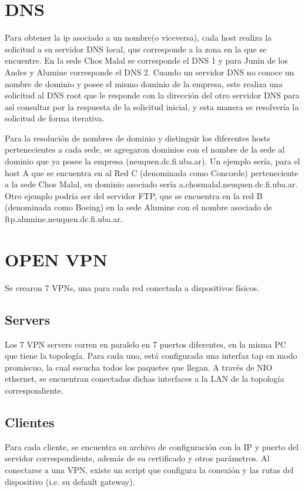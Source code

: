 \documentclass[12pt, a4paper, spanish]{article}
\begin{document}
\newpage


\newpage
\section{DNS}
Para obtener la ip asociado a un nombre(o viceversa), cada host realiza 
la solicitud a su servidor DNS local, que corresponde a la zona en la que 
se encuentre.
En la sede Chos Malal se corresponde el DNS 1 y para Junín de los Andes y 
Alumine corresponde el DNS 2.
Cuando un servidor DNS no conoce un nombre de dominio y posee el mismo 
dominio de la empresa, este realiza una solicitud al DNS root que le responde 
con la dirección del otro servidor DNS para así consultar por la respuesta de 
la solicitud inicial, y esta manera se resolvería la solicitud de forma 
iterativa.

Para la resolución de nombres de dominio y distinguir los diferentes hosts 
pertenecientes a cada sede, se agregaron dominios con el nombre de la sede 
al dominio que ya posee la empresa (neuquen.dc.fi.uba.ar).
Un ejemplo sería, para el host A que se encuentra en al Red C (denominada 
como Concorde) perteneciente a la sede Chos Malal, su dominio asociado sería 
a.chosmalal.neuquen.dc.fi.uba.ar.
Otro ejemplo podría ser del servidor FTP, que se encuentra en la red B 
(denominada como Boeing) en la sede Alumine con el nombre asociado de 
ftp.alumine.neuquen.dc.fi.uba.ar.

\section{OPEN VPN}
Se crearon 7 VPNs, una para cada red conectada a dispositivos físicos.

\subsection{Servers}
Los 7 VPN servers corren en paralelo en 7 puertos diferentes, en la misma PC 
que tiene la topología.
Para cada uno, está configurada una interfaz tap en modo promiscuo, la cual 
escucha todos los paquetes que llegan.
A través de NIO ethernet, se encuentran conectadas dichas interfaces a la LAN 
de la topología correspondiente.

\subsection{Clientes}
Para cada cliente, se encuentra su archivo de configuración con la IP y 
puerto del servidor correspondiente, además de su certificado y otros 
parámetros.
Al conectarse a una VPN, existe un script que configura la conexión y 
las rutas del dispositivo (i.e. su default gateway).
\end{document}

